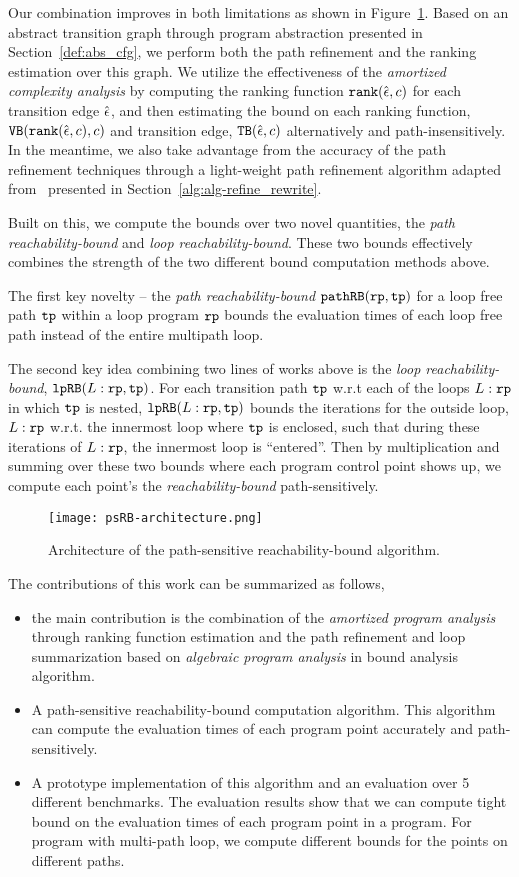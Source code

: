 Our combination improves in both limitations as shown in Figure~\ref{fig:psRB-architecture}.
Based on an abstract transition graph through program abstraction presented in Section~\ref{def:abs_cfg},
we perform both the path refinement and the ranking estimation over this graph.
We utilize the effectiveness of the \emph{amortized complexity analysis} by computing the ranking function $\mathtt{rank}(\hat{\mathtt{\epsilon}{}}, c)$ for each transition edge $\hat{\mathtt{\epsilon}{}}$, and then estimating the bound on each ranking function, ${\mathtt{VB}}(\mathtt{rank}(\hat{\mathtt{\epsilon}{}}, c), c)$ and transition edge, ${\mathtt{TB}}(\hat{\mathtt{\epsilon}{}}, c)$ alternatively and path-insensitively.
In the meantime, we also take advantage from the accuracy of the path refinement techniques through a light-weight path refinement algorithm adapted from~\cite{GulwaniJK09} presented in Section~\ref{alg:alg-refine_rewrite}.

Built on this, we compute the bounds over two novel quantities, the \emph{path reachability-bound} and \emph{loop reachability-bound}. These two bounds effectively combines the strength of the two different bound computation methods above.

The first key novelty -- the \emph{path reachability-bound} $\mathtt{pathRB}(\mathtt{rp}, \mathtt{tp})$ for a loop free path $\mathtt{tp}$ within a loop program $\mathtt{rp}$ bounds the evaluation times of each loop free path instead of the entire multipath loop.

The second key idea combining two lines of works above is the \emph{loop reachability-bound}, $\mathtt{lpRB}(L:\mathtt{rp}, \mathtt{tp})$.
For each transition path $\mathtt{tp}$ w.r.t each of the loops $L:\mathtt{rp}$ in which $\mathtt{tp}$ is nested,
$\mathtt{lpRB}(L:\mathtt{rp}, \mathtt{tp})$ bounds the iterations for
the outside loop, $L:\mathtt{rp}$ w.r.t. the innermost loop where $\mathtt{tp}$ is enclosed,
such that during these iterations of $L:\mathtt{rp}$, the innermost loop is ``entered''. 
Then by multiplication and summing over these two bounds where each program control point shows up, we compute each point's the \emph{reachability-bound} path-sensitively.
\begin{figure}
\centering
\texttt{[image: psRB-architecture.png]}
\caption{Architecture of the path-sensitive reachability-bound algorithm.}
\label{fig:psRB-architecture}
\end{figure}
The contributions of this work can be summarized as follows,
\begin{itemize}
  \item the main contribution is the combination of the \emph{amortized program analysis} through ranking function estimation and the path refinement and loop summarization based on \emph{algebraic program analysis} in bound analysis algorithm.
  \item A path-sensitive reachability-bound computation algorithm.
  This algorithm can compute the evaluation times of each program point accurately and path-sensitively.
  \item A prototype implementation of this algorithm and an evaluation over 5 different benchmarks.
  The evaluation results show that we can compute tight bound on the evaluation times of each program point in a program. For program with multi-path loop, we compute different bounds for the points on different paths.
\end{itemize}